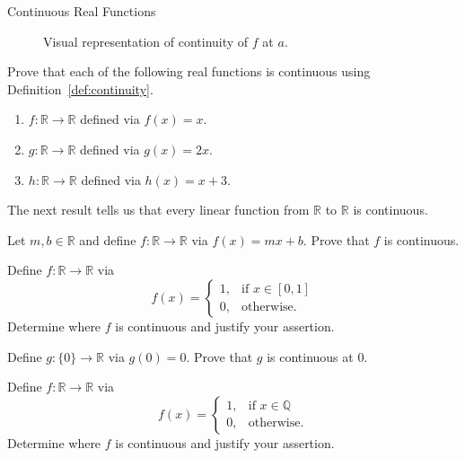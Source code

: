 \begin{section}{Continuous Real Functions}
\begin{figure}[h!]
\caption{Visual representation of continuity of $f$ at $a$.}\label{fig:continuity}
\end{figure}

\begin{problem}
Prove that each of the following real functions is continuous using Definition~\ref{def:continuity}.
\begin{enumerate}[label=\textrm{(\alph*)}]
\item $f:\mathbb{R}\to \mathbb{R}$ defined via $f(x)=x$.
\item $g:\mathbb{R}\to \mathbb{R}$ defined via $g(x)=2x$.
\item $h:\mathbb{R}\to \mathbb{R}$ defined via $h(x)=x+3$.
\end{enumerate}
\end{problem}

The next result tells us that every linear function from $\mathbb{R}$ to $\mathbb{R}$ is continuous.

\begin{problem}
Let $m,b\in\mathbb{R}$ and define $f:\mathbb{R}\to\mathbb{R}$ via $f(x)=mx+b$. Prove that $f$ is continuous.
\end{problem}

\begin{problem}
Define $f:\mathbb{R}\to\mathbb{R}$ via 
\[
f(x)=\begin{cases}
1, & \text{if }x\in[0,1]\\
0, & \text{otherwise}.
\end{cases}
\]
Determine where $f$ is continuous and justify your assertion.
\end{problem}

\begin{problem}
Define $g:\{0\}\to \mathbb{R}$ via $g(0)=0$.  Prove that $g$ is continuous at $0$.
\end{problem}

\begin{problem}
Define $f:\mathbb{R}\to\mathbb{R}$ via 
\[
f(x)=\begin{cases}
1, & \text{if }x\in \mathbb{Q}\\
0, & \text{otherwise}.
\end{cases}
\]
Determine where $f$ is continuous and justify your assertion.
\end{problem}


\end{section}

